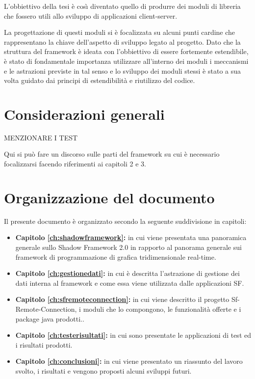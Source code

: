 L'obbiettivo della tesi \`e cos{\`\i} diventato quello di produrre dei moduli di libreria che fossero utili allo sviluppo di applicazioni client-server.

La progettazione di questi moduli si \`e focalizzata su alcuni punti cardine che rappresentano la chiave dell'aspetto di sviluppo legato al progetto. Dato che la struttura del framework \`e ideata con l'obbiettivo di essere fortemente estendibile, \`e stato di fondamentale importanza utilizzare all'interno dei moduli i meccanismi e le astrazioni previste in tal senso e lo sviluppo dei moduli stessi \`e stato a sua volta guidato dai principi di estendibilit\`a e riutilizzo del codice.

\section{Considerazioni generali}
\label{sec:considerazioni}
MENZIONARE I TEST



Qui si pu\`o fare un discorso sulle parti del framework su cui \`e necessario focalizzarsi facendo riferimenti ai capitoli 2 e 3.

\section{Organizzazione del documento}
\label{sec:orgtesi}
Il presente documento \`e organizzato secondo la seguente suddivisione in capitoli:
\begin{itemize}
	\item  \textbf{Capitolo \ref{ch:shadowframework}:} in cui viene presentata una panoramica generale sullo Shadow Framework 2.0 in rapporto al panorama generale sui framework di programmazione di grafica tridimensionale real-time.
	\item  \textbf{Capitolo \ref{ch:gestionedati}:} in cui \`e descritta l'astrazione di gestione dei dati interna al framework e come essa viene utilizzata dalle applicazioni \ac{SF}.
	\item  \textbf{Capitolo \ref{ch:sfremoteconnection}:} in cui viene descritto il progetto Sf-Remote-Connection, i moduli che lo compongono, le funzionalit\`a offerte e i package java prodotti..
	\item  \textbf{Capitolo \ref{ch:testerisultati}:} in cui sono presentate le applicazioni di test ed i risultati prodotti.
	\item  \textbf{Capitolo \ref{ch:conclusioni}:} in cui viene presentato un riassunto del lavoro svolto, i risultati e vengono proposti alcuni sviluppi futuri.
\end{itemize}


